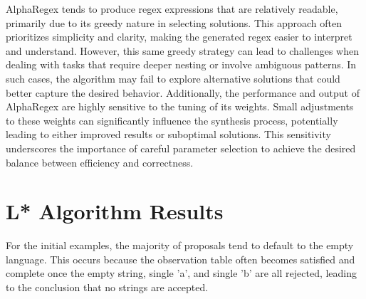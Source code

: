 \indent\indent AlphaRegex tends to produce regex expressions that are relatively readable, primarily due to its greedy nature in selecting solutions. This approach often prioritizes simplicity and clarity, making the generated regex easier to interpret and understand. However, this same greedy strategy can lead to challenges when dealing with tasks that require deeper nesting or involve ambiguous patterns. In such cases, the algorithm may fail to explore alternative solutions that could better capture the desired behavior. Additionally, the performance and output of AlphaRegex are highly sensitive to the tuning of its weights. Small adjustments to these weights can significantly influence the synthesis process, potentially leading to either improved results or suboptimal solutions. This sensitivity underscores the importance of careful parameter selection to achieve the desired balance between efficiency and correctness.






\section{L* Algorithm Results}

For the initial examples, the majority of proposals tend to default to the empty language. This occurs because the observation table often becomes satisfied and complete once the empty string, single 'a', and single 'b' are all rejected, leading to the conclusion that no strings are accepted.


